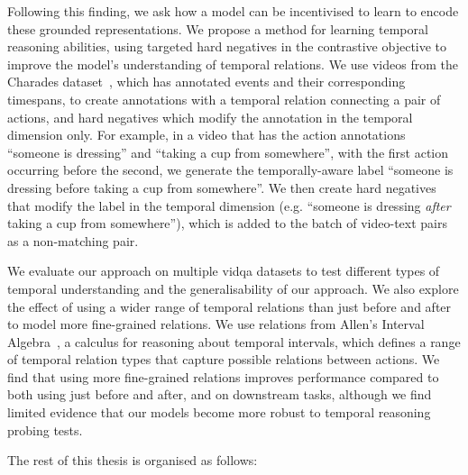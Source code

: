 Following this finding, we ask how a model can be incentivised to learn to
encode these grounded representations. We propose a method for learning
temporal reasoning abilities, using targeted hard negatives in the contrastive
objective to improve the model's understanding of temporal relations. We use
videos from the Charades dataset~\citep{sigurdsson2016charades}, which has
annotated events and their corresponding timespans, to create annotations with
a temporal relation connecting a pair of actions, and hard negatives which
modify the annotation in the temporal dimension only. For example, in a video
that has the action annotations ``someone is dressing'' and ``taking a cup from
somewhere'', with the first action occurring before the second, we generate the
temporally-aware label ``someone is dressing before taking a cup from
somewhere''. We then create hard negatives that modify the label in the
temporal dimension (e.g. ``someone is dressing \textit{after} taking a cup from
somewhere''), which is added to the batch of video-text pairs as a non-matching
pair. 

We evaluate our approach on multiple \acrshort{vidqa} datasets to test
different types of temporal understanding and the generalisability of our
approach. We also explore the effect of using a wider range of temporal
relations than just before and after to model more fine-grained relations. We
use relations from Allen's Interval Algebra~\citep{allen1983interval}, a
calculus for reasoning about temporal intervals, which defines a range of
temporal relation types that capture possible relations between actions.  We
find that using more fine-grained relations improves performance compared to
both using just before and after, and on downstream tasks, although we find
limited evidence that our models become more robust to temporal reasoning
probing tests.

The rest of this thesis is organised as follows:

